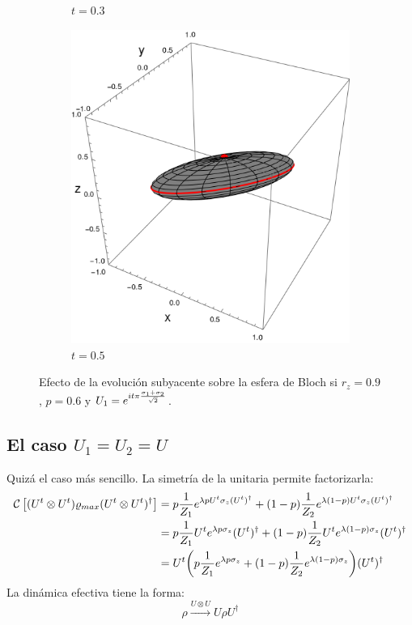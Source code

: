 \begin{figure}[h!]
\begin{subfigure}{0.32\textwidth}
      \caption{$t=0.3$}
    \end{subfigure}
    \begin{subfigure}{0.32\textwidth}
      \centering
      \includegraphics[width=0.9\linewidth]{maxent/figures/U1xU2_H1=Pi(sx+sy)_H2=Id_z=0.9_p=0.6t=0.5.png}
      \caption{$t=0.5$}
    \end{subfigure}
    \caption{Efecto de la evolución subyacente sobre la esfera de Bloch si $r_{z}=0.9$, $p=0.6$ y $U_{1}=e^{it\pi \frac{\sigma_{1}+\sigma_{2}}{\sqrt{2}}}$.}
    \label{fig:SxSySequence}
\end{figure}

\subsection{El caso $U_{1}=U_{2}=U$}

Quizá el caso más sencillo. La simetría de la unitaria permite factorizarla:
\begin{align*}
\mathcal{C}\left[(U^{t}\otimes U^{t})\varrho_{max}(U^{t}\otimes U^{t})^{\dag}\right]&=p\frac{1}{Z_{1}}e^{\lambda p U^{t}\sigma_{z}(U^t)^{\dag}}+(1-p)\frac{1}{Z_{2}}e^{\lambda (1-p)U^{t}\sigma_{z}(U^t)^{\dag}}\\
&=p\frac{1}{Z_{1}}U^{t}e^{\lambda p \sigma_{z}}(U^t)^{\dag}+(1-p)\frac{1}{Z_{2}}U^{t}e^{\lambda (1-p)\sigma_{z}}(U^t)^{\dag}\\
&=U^{t}\qty(p\frac{1}{Z_{1}}e^{\lambda p \sigma_{z}}+(1-p)\frac{1}{Z_{2}}e^{\lambda (1-p)\sigma_{z}})(U^t)^{\dag}\\
\end{align*}
La dinámica efectiva tiene la forma:
\begin{equation}
    \rho\xrightarrow{U\otimes U}U\rho U^{\dagger}
\end{equation}


